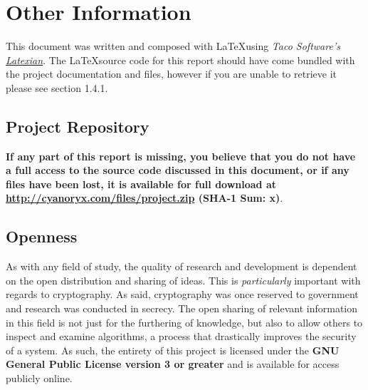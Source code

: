 \section{Other Information}

This document was written and composed with \LaTeX using \emph{Taco Software's \href{http://tacosw.com/latexian/}{Latexian}}. The \LaTeX source code for this report should have come bundled with the project documentation and files, however if you are unable to retrieve it please see section 1.4.1.

\subsection{Project Repository} \label{sec:repo}

\textbf{If any part of this report is missing, you believe that you do not have a full access to the source code discussed in this document, or if any files have been lost, it is available for full download at \url{http://cyanoryx.com/files/project.zip} (SHA-1 Sum: x)}. 

\subsection{Openness}

As with any field of study, the quality of research and development is dependent on the open distribution and sharing of ideas. This is \emph{particularly} important with regards to cryptography. As said, cryptography was once reserved to government and research was conducted in secrecy. The open sharing of relevant information in this field is not just for the furthering of knowledge, but also to allow others to inspect and examine algorithms, a process that drastically improves the security of a system. As such, the entirety of this project is licensed under the \textbf{GNU General Public License version 3 or greater} and is available for access publicly online.